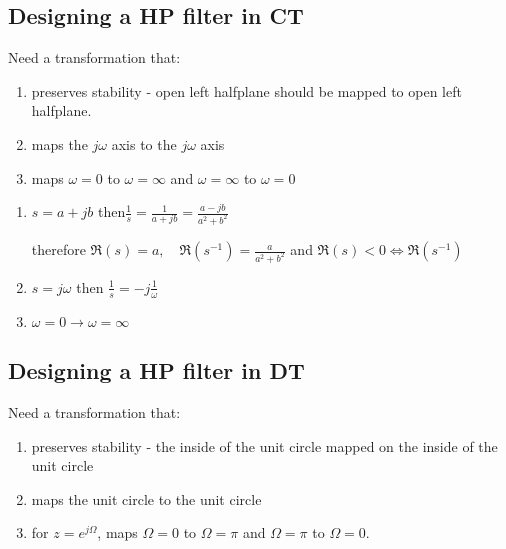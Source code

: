 \documentclass[8pt,a4paper]{scrartcl}
\begin{document}
\begin{multicols*}{3}
\subsection{Designing a HP filter in CT}

Need a transformation that:
\begin{enumerate}
\ncompaq
\item preserves stability - open left halfplane should be mapped to open left halfplane.
\item maps the $j\omega$ axis to the $j\omega$ axis
\item maps $\omega = 0$ to $\omega = \infty$ and $\omega=\infty$ to $\omega=0$
\end{enumerate}


\begin{enumerate}
\ncompaq
\item $s=a+jb$ then$ \frac{1}{s}=\frac{1}{a+jb}=\frac{a-jb}{a^2+b^2}$

therefore $\Re(s)=a,\quad \Re(s^{-1})=\frac{a}{a^2+b^2}$ and $\Re(s)<0\Leftrightarrow \Re(s^{-1})$
\item $s=j\omega$ then $\frac{1}{s}=-j \frac{1}{\omega}$ 

\item $\omega=0\rightarrow \omega=\infty$
\end{enumerate}



\subsection{Designing a HP filter in DT}

Need a transformation that:
\begin{enumerate}
\ncompaq
\item preserves stability - the inside of the unit circle mapped on the inside of the unit circle
\item maps the unit circle to the unit circle
\item for $z=e^{j\Omega}$, maps $\Omega = 0$ to $\Omega= \pi$ and $\Omega=\pi$ to $\Omega = 0$.
\end{enumerate}


\end{multicols*}
\end{document}
